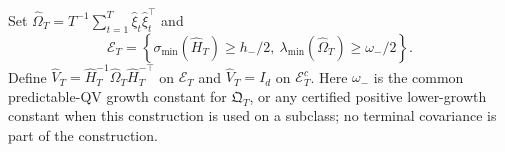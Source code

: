 Set \(\widehat\Omega_T=T^{-1}\sum_{t=1}^T\widehat\xi_t\widehat\xi_t^\top\) and
\[
 \mathcal E_T=\left\{\sigma_{\min}(\widehat H_T)\ge h_-/2,
 \ \lambda_{\min}(\widehat\Omega_T)\ge\omega_-/2\right\}.
\]
Define \(\widehat V_T=\widehat H_T^{-1}\widehat\Omega_T\widehat H_T^{-\top}\) on \(\mathcal E_T\) and \(\widehat V_T=I_d\) on \(\mathcal E_T^c\). Here \(\omega_-\) is the common predictable-QV growth constant for \(\mathfrak Q_T\), or any certified positive lower-growth constant when this construction is used on a subclass; no terminal covariance is part of the construction.